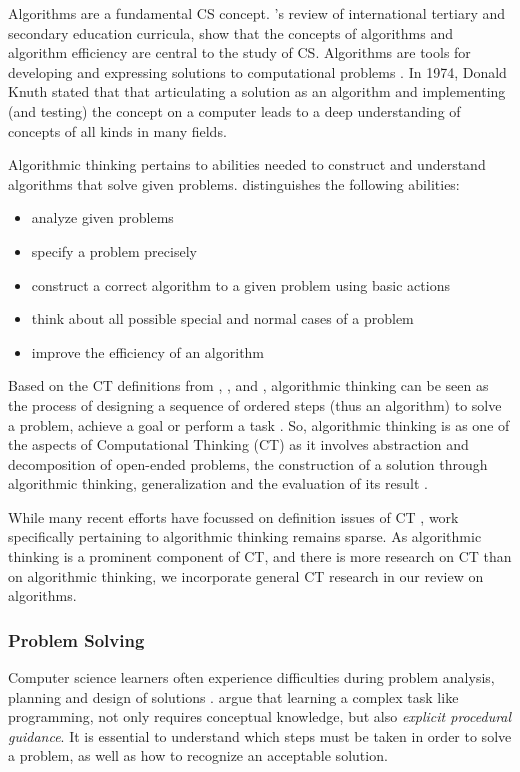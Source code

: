Algorithms are a fundamental CS concept. 's review of international tertiary and secondary education curricula, show that the concepts of algorithms and algorithm efficiency are central to the study of CS. Algorithms are tools for developing and expressing solutions to computational problems \cite{GroverPea2013}. In 1974, Donald Knuth stated that that articulating a solution as an algorithm and implementing (and testing) the concept on a computer leads to a deep understanding of concepts of all kinds in many fields.

Algorithmic thinking pertains to abilities needed to construct and understand algorithms that solve given problems.  distinguishes the following abilities:
\begin{itemize}
\item analyze given problems
\item specify a problem precisely
\item construct a correct algorithm to a given problem using basic actions
\item think about all possible special and normal cases of a problem
\item improve the efficiency of an algorithm
\end{itemize}
Based on the CT definitions from \citeauthor{CAS2014CT}, \citeauthor{Google2017CT}, \citeauthor{BrennanResnick2012} and \citeauthor{CSTA2011CT}, algorithmic thinking can be seen as the process of designing a sequence of ordered steps (thus an algorithm) to solve a problem, achieve a goal or perform a task \cite{corradini2017conceptions}. So, algorithmic thinking is as one of the aspects of Computational Thinking (CT) as it involves abstraction and decomposition of open-ended problems, the construction of a solution through algorithmic thinking, generalization and the evaluation of its result \cite{Wing2006}.



While many recent efforts have focussed on definition issues of CT \cite{GroverPea2013}, work specifically pertaining to algorithmic thinking remains sparse. As algorithmic thinking is a prominent component of CT, and there is more research on CT than on algorithmic thinking, we incorporate general CT research in our review on algorithms.


\subsubsection{Problem Solving}\label{sec:ProbSolving}
Computer science learners often experience difficulties during problem analysis, planning and design of solutions \cite{Hazzan2011}.  argue that learning a complex task like programming, not only requires conceptual knowledge, but also \emph{explicit procedural guidance}. It is essential to understand which steps must be taken in order to solve a problem, as well as how to recognize an acceptable solution.


